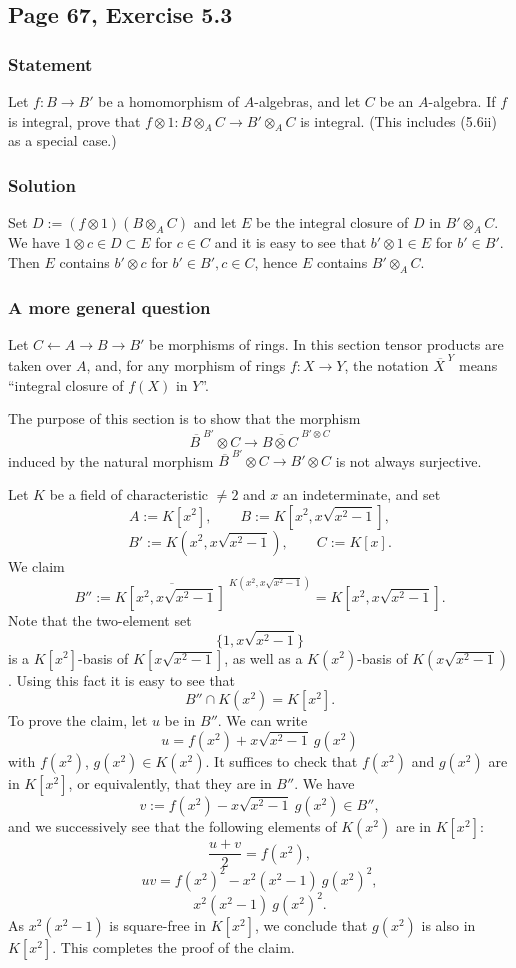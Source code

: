 \documentclass[parskip=half,fontsize=12pt]{scrartcl}%
\begin{document}
\subsection{Page 67, Exercise 5.3}%

\subsubsection{Statement}

Let $f:B\to B'$ be a homomorphism of $A$-algebras, and let $C$ be an $A$-algebra. If $f$ is integral, prove that $f\otimes 1:B\otimes_AC\to B'\otimes_AC$ is integral. (This includes (5.6ii) as a special case.)

\subsubsection{Solution}

Set $D:=(f\otimes1)(B\otimes_AC)$ and let $E$ be the integral closure of $D$ in $B'\otimes_AC$. We have $1\otimes c\in D\subset E$ for $c\in C$ and it is easy to see that $b'\otimes1\in E$ for $b'\in B'$. Then $E$ contains $b'\otimes c$ for $b'\in B',c\in C$, hence $E$ contains $B'\otimes_AC$.

\subsubsection{A more general question}%

Let $C\leftarrow A\to B\to B'$ be morphisms of rings. In this section tensor products are taken over $A$, and, for any morphism of rings $f:X\to Y$, the notation $\overline{X\ }^Y$ means ``integral closure of $f(X)$ in $Y$''. 

The purpose of this section is to show that the morphism 
$$
\overline{B\ }^{B'}\otimes C\to\overline{B\otimes C\ }^{B'\otimes C}
$$ 
induced by the natural morphism $\overline{B\ }^{B'}\otimes C\to B'\otimes C$ is not always surjective. 

Let $K$ be a field of characteristic $\ne2$ and $x$ an indeterminate, and set 
$$
A:=K[x^2],\qquad B:=K\left[x^2,x\sqrt{x^2-1}\right],
$$
$$
B':=K\left(x^2,x\sqrt{x^2-1}\right),\qquad C:=K[x].
$$ 
We claim 
$$
B'':=\overline{K\left[x^2,x\sqrt{x^2-1}\right]\ }^{K\left(x^2,x\sqrt{x^2-1}\right)}=K\left[x^2,x\sqrt{x^2-1}\right].
$$ 
Note that the two-element set 
$$
\{1,x\sqrt{x^2-1}\}
$$ 
is a $K[x^2]$-basis of $K[x\sqrt{x^2-1}]$, as well as a $K(x^2)$-basis of $K(x\sqrt{x^2-1})$. Using this fact it is easy to see that 
$$
B''\cap K(x^2)=K[x^2].
$$ 
To prove the claim, let $u$ be in $B''$. We can write 
$$
u=f(x^2)+x\sqrt{x^2-1}\ g(x^2)
$$ 
with $f(x^2)$, $g(x^2)\in K(x^2)$. It suffices to check that $f(x^2)$ and $g(x^2)$ are in $K[x^2]$, or equivalently, that they are in $B''$. We have 
$$
v:=f(x^2)-x\sqrt{x^2-1}\ g(x^2)\in B'',
$$ 
and we successively see that the following elements of $K(x^2)$ are in $K[x^2]$: 
$$
\frac{u+v}2=f(x^2),
$$ 
$$
uv=f(x^2)^2-x^2(x^2-1)\ g(x^2)^2,
$$ 
$$
x^2(x^2-1)\ g(x^2)^2.
$$ 
As $x^2(x^2-1)$ is square-free in $K[x^2]$, we conclude that $g(x^2)$ is also in $K[x^2]$. This completes the proof of the claim. 
\end{document}
